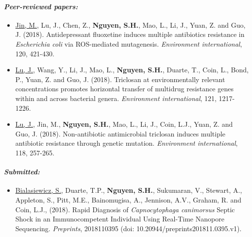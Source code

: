 \paragraph*{\textit{Peer-reviewed papers:}}
\begin{itemize}
\item \underline{Jin, M.}, Lu, J., Chen, Z., \textbf{Nguyen, S.H.}, Mao, L., Li, J., Yuan, Z. and Guo, J. (2018). Antidepressant fluoxetine induces multiple antibiotics resistance in \emph{Escherichia coli} via ROS-mediated mutagenesis. \emph{Environment international}, 120, 421-430.
\item \underline{Lu, J.}, Wang, Y., Li, J., Mao, L., \textbf{Nguyen, S.H.}, Duarte, T., Coin, L., Bond, P., Yuan, Z. and Guo, J. (2018). Triclosan at environmentally relevant concentrations promotes horizontal transfer of multidrug resistance genes within and across bacterial genera. \emph{Environment international}, 121, 1217-1226.
\item \underline{Lu, J.}, Jin, M., \textbf{Nguyen, S.H.}, Mao, L., Li, J., Coin, L.J., Yuan, Z. and Guo, J. (2018). Non-antibiotic antimicrobial triclosan induces multiple antibiotic resistance through genetic mutation. \emph{Environment international}, 118, 257-265.
\end{itemize}

\paragraph*{\textit{Submitted:}}
\begin{itemize}
\item \underline{Bialasiewicz, S.}, Duarte, T.P., \textbf{Nguyen, S.H.}, Sukumaran, V., Stewart, A., Appleton, S., Pitt, M.E., Bainomugisa, A., Jennison, A.V., Graham, R. and Coin, L.J., (2018). Rapid Diagnosis of \emph{Capnocytophaga canimorsus} Septic Shock in an Immunocompetent Individual Using Real-Time Nanopore Sequencing. \emph{Preprints}, 2018110395 (doi: 10.20944/preprints201811.0395.v1).
\end{itemize}


